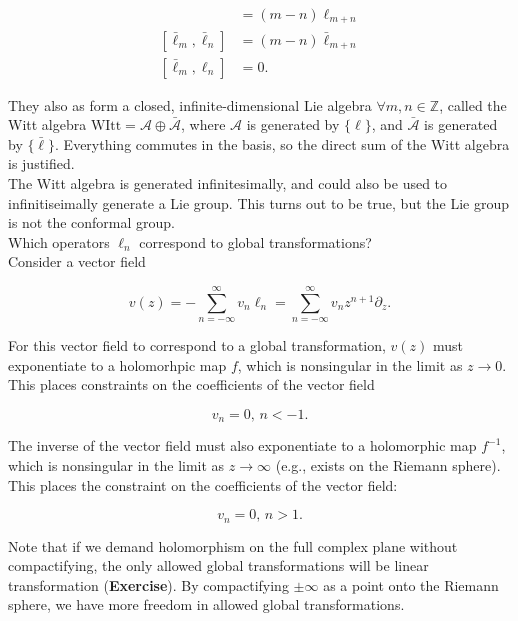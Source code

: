 \documentclass[10pt]{article}
\begin{document}
\begin{align}
[ \ell_m , \ell_n ] &= (m-n) \ell_{m+n} \\
[ \bar{\ell}_m, \bar{\ell}_n ] &= (m-n) \bar{\ell}_{m+n} \\
[\bar{\ell}_m , \ell_n ] &= 0.
\end{align}

\noindent They also as form a closed, infinite-dimensional Lie algebra $\forall m,n \in \mathbb{Z}$, called the Witt algebra $\text{WItt} = \mathcal{A} \oplus \bar{\mathcal{A}}$, where $\mathcal{A}$ is generated by $\{ \ell \}$, and $\bar{\mathcal{A}}$ is generated by $\{ \bar{\ell} \}$. Everything commutes in the basis, so the direct sum of the Witt algebra is justified. \\

\noindent The Witt algebra is generated infinitesimally, and could also be used to infinitiseimally generate a Lie group. This turns out to be true, but the Lie group is not the conformal group. \\

\noindent Which operators $\ell_n$ correspond to global transformations? \\

\noindent Consider a vector field 

\begin{equation}
v(z) = - \sum_{n=-\infty}^{\infty} v_n \ell_n = \sum_{n=-\infty}^{\infty} v_n z^{n+1} \partial_z.
\end{equation}

\noindent For this vector field to correspond to a global transformation, $v(z)$ must exponentiate to a holomorhpic map $f$, which is nonsingular in the limit as $z \rightarrow 0$. This places constraints on the coefficients of the vector field 

\begin{equation}
v_n = 0, \, n < -1.
\end{equation}

\noindent The inverse of the vector field must also exponentiate to a holomorphic map $f^{-1}$, which is nonsingular in the limit as $z \rightarrow \infty$ (e.g., exists on the Riemann sphere). This places the constraint on the coefficients of the vector field: 

\begin{equation}
v_n = 0, \, n>1.
\end{equation}

\noindent Note that if we demand holomorphism on the full complex plane without compactifying, the only allowed global transformations will be linear transformation (\textbf{Exercise}). By compactifying $\pm \infty$ as a point onto the Riemann sphere, we have more freedom in allowed global transformations. \\
\end{document}
